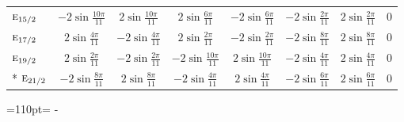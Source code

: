 \documentclass[10pt,a4paper]{article}
\newcommand{\needspace}[1]{\par\penalty-100\begingroup\dimen0=#1\relax\dimen2=\pagegoal
  \advance\dimen2-\pagetotal\ifdim\dimen0>\dimen2\relax\ifdim\dimen2>0pt\vfil\break\fi\fi
  \endgroup}
\numberwithin{equation}{section}
\newcommand{\irr}[1]{\text{\normalfont\scshape #1}}
\begin{document}
{{\begin{longtable}{@{}lccccccc@{}}
$\irr{e}_{15/2}$ & $-2\sin\tfrac{10\pi}{11}$ & $2\sin\tfrac{10\pi}{11}$ & $2\sin\tfrac{6\pi}{11}$ & $-2\sin\tfrac{6\pi}{11}$ & $-2\sin\tfrac{2\pi}{11}$ & $2\sin\tfrac{2\pi}{11}$ & $0$\\
$\irr{e}_{17/2}$ & $2\sin\tfrac{4\pi}{11}$ & $-2\sin\tfrac{4\pi}{11}$ & $2\sin\tfrac{2\pi}{11}$ & $-2\sin\tfrac{2\pi}{11}$ & $-2\sin\tfrac{8\pi}{11}$ & $2\sin\tfrac{8\pi}{11}$ & $0$\\
$\irr{e}_{19/2}$ & $2\sin\tfrac{2\pi}{11}$ & $-2\sin\tfrac{2\pi}{11}$ & $-2\sin\tfrac{10\pi}{11}$ & $2\sin\tfrac{10\pi}{11}$ & $-2\sin\tfrac{4\pi}{11}$ & $2\sin\tfrac{4\pi}{11}$ & $0$\\*
$\irr{e}_{21/2}$ & $-2\sin\tfrac{8\pi}{11}$ & $2\sin\tfrac{8\pi}{11}$ & $-2\sin\tfrac{4\pi}{11}$ & $2\sin\tfrac{4\pi}{11}$ & $-2\sin\tfrac{6\pi}{11}$ & $2\sin\tfrac{6\pi}{11}$ & $0$\\
\bottomrule\end{longtable}}}
\needspace{110pt}
\end{document}
